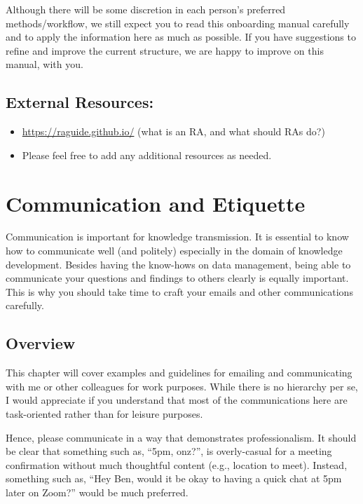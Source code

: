 \documentclass[
]{book}
\begin{document}
Although there will be some discretion in each person's preferred methods/workflow, we still expect you to read this onboarding manual carefully and to apply the information here as much as possible. If you have suggestions to refine and improve the current structure, we are happy to improve on this manual, with you.

\hypertarget{external-resources}{%
\section{External Resources:}\label{external-resources}}

\begin{itemize}
\item
  \url{https://raguide.github.io/} (what is an RA, and what should RAs do?)
\item
  Please feel free to add any additional resources as needed.
\end{itemize}

\hypertarget{communication-and-etiquette}{%
\chapter{\texorpdfstring{\textbf{Communication and Etiquette}}{Communication and Etiquette}}\label{communication-and-etiquette}}

Communication is important for knowledge transmission. It is essential to know how to communicate well (and politely) especially in the domain of knowledge development. Besides having the know-hows on data management, being able to communicate your questions and findings to others clearly is equally important. This is why you should take time to craft your emails and other communications carefully.

\hypertarget{overview}{%
\section{Overview}\label{overview}}

This chapter will cover examples and guidelines for emailing and communicating with me or other colleagues for work purposes. While there is no hierarchy per se, I would appreciate if you understand that most of the communications here are task-oriented rather than for leisure purposes.

Hence, please communicate in a way that demonstrates professionalism. It should be clear that something such as, ``5pm, onz?'', is overly-casual for a meeting confirmation without much thoughtful content (e.g., location to meet). Instead, something such as, ``Hey Ben, would it be okay to having a quick chat at 5pm later on Zoom?'' would be much preferred.
\end{document}
